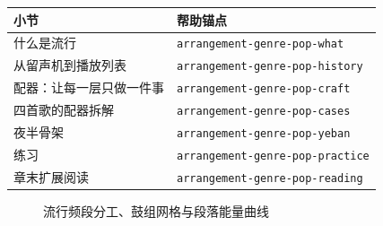 \begin{helpmapping}
\begin{longtable}{p{}p{}}
\toprule
小节 & 帮助锚点 \\
\midrule
什么是流行 & \texttt{arrangement-genre-pop-what} \\
从留声机到播放列表 & \texttt{arrangement-genre-pop-history} \\
配器：让每一层只做一件事 & \texttt{arrangement-genre-pop-craft} \\
四首歌的配器拆解 & \texttt{arrangement-genre-pop-cases} \\
夜半骨架 & \texttt{arrangement-genre-pop-yeban} \\
练习 & \texttt{arrangement-genre-pop-practice} \\
章末扩展阅读 & \texttt{arrangement-genre-pop-reading} \\
\bottomrule
\end{longtable}
\end{helpmapping}

\begin{figure}[htbp]\centering
{}
\caption{流行频段分工、鼓组网格与段落能量曲线}
\end{figure}
